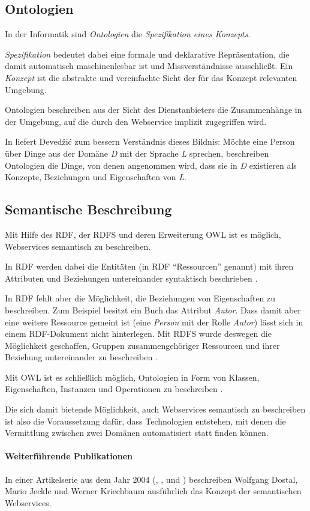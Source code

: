 \subsection{Ontologien}

In der Informatik sind \emph{Ontologien} die \emph{Spezifikation eines Konzepts}. 

\emph{Spezifikation} bedeutet dabei eine formale und deklarative Repräsentation, die damit automatisch maschinenlesbar ist und Missverständnisse ausschließt. Ein \emph{Konzept} ist die abstrakte und vereinfachte Sicht der für das Konzept relevanten Umgebung.

Ontologien beschreiben aus der Sicht des Dienstanbieters die Zusammenhänge in der Umgebung, auf die durch den Webservice implizit zugegriffen wird.

In \cite{dcswe} liefert Devedžić zum bessern Verständnis dieses Bildnis: Möchte eine Person über Dinge aus der Domäne \emph{D} mit der Sprache \emph{L} sprechen, beschreiben Ontologien die Dinge, von denen angenommen wird, dass sie in \emph{D} existieren als Konzepte, Beziehungen und Eigenschaften von \emph{L}.

\subsection{Semantische Beschreibung}

Mit Hilfe des \ac{RDF}, der \ac{RDFS} und deren Erweiterung \ac{OWL} ist es möglich, Webservices semantisch zu beschreiben. 

In \ac{RDF} werden dabei die Entitäten (in \ac{RDF} "`Ressourcen"' genannt) mit ihren Attributen und Beziehungen untereinander syntaktisch beschrieben \cite{w3c-rdf}.

In \ac{RDF} fehlt aber die Möglichkeit, die Beziehungen von Eigenschaften zu beschreiben. Zum Beispiel besitzt ein Buch das Attribut \emph{Autor}. Dass damit aber eine weitere Ressource gemeint ist (eine \emph{Person} mit der Rolle \emph{Autor}) lässt sich in einem \ac{RDF}-Dokument nicht hinterlegen. Mit \ac{RDFS} wurde deswegen die Möglichkeit geschaffen, Gruppen zusammengehöriger Ressourcen und ihrer Beziehung untereinander zu beschreiben \cite{w3c-rdfs}.

Mit \ac{OWL} ist es schließlich möglich, Ontologien in Form von Klassen, Eigenschaften, Instanzen und Operationen zu beschreiben \cite{w3c-owl2primer}.

Die sich damit bietende Möglichkeit, auch Webservices semantisch zu beschreiben ist also die Voraussetzung dafür, dass Technologien entstehen, mit denen die Vermittlung zwischen zwei Domänen automatisiert statt finden können.

\paragraph{Weiterführende Publikationen} In einer Artikelserie aus dem Jahr 2004 (\cite{xmlspek1}, \cite{xmlspek2}, \cite{xmlspek3} und \cite{xmlspek4}) beschreiben Wolfgang Dostal, Mario Jeckle und Werner Kriechbaum ausführlich das Konzept der semantischen Webservices.